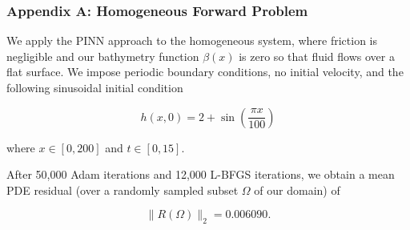 \begin{frame}
    \frametitle{Appendix A: Homogeneous Forward Problem}

    We apply the PINN approach to the homogeneous system, where friction is negligible and our bathymetry function 
    $\beta(x)$ is zero so that fluid flows over a flat surface.  We impose periodic boundary conditions, no initial 
    velocity, and the following sinusoidal initial condition

    $$
    h(x, 0) = 2 + \sin{\left( \frac{\pi x}{100} \right)}
    $$

    where $x \in [0, 200]$ and $t \in [0, 15]$.

    \medskip
    \pause

    After 50,000 Adam iterations and 12,000 L-BFGS iterations, we obtain a mean PDE residual (over a randomly sampled 
    subset $\Omega$ of our domain) of 
    
    $$
    \lVert R(\Omega) \rVert_2 = 0.006090.
    $$
\end{frame}